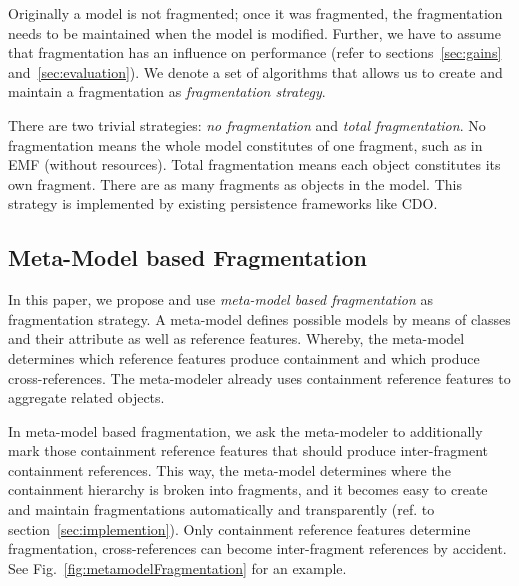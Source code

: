 Originally a model is not fragmented; once it was fragmented, the fragmentation needs to be maintained when the model is modified. Further, we have to assume that fragmentation has an influence on performance (refer to sections~\ref{sec:gains} and~\ref{sec:evaluation}). We denote a set of algorithms that allows us to create and maintain a fragmentation as \emph{fragmentation strategy}.

There are two trivial strategies: \emph{no fragmentation} and \emph{total fragmentation}. No fragmentation means the whole model constitutes of one fragment, such as in EMF (without resources). Total fragmentation means each object constitutes its own fragment. There are as many fragments as objects in the model. This strategy is implemented by existing persistence frameworks like CDO.

\subsection{Meta-Model based Fragmentation}

In this paper, we propose and use \emph{meta-model based fragmentation} as fragmentation strategy. A meta-model defines possible models by means of classes and their attribute as well as reference features. Whereby, the meta-model determines which reference features produce containment and which produce cross-references. The meta-modeler already uses containment reference features to aggregate related objects.

In meta-model based fragmentation, we ask the meta-modeler to additionally mark those containment reference features that should produce inter-fragment containment references. 
This way, the meta-model determines where the containment hierarchy is broken into fragments, and it becomes easy to create and maintain fragmentations automatically and transparently (ref. to section~\ref{sec:implemention}). Only containment reference features determine fragmentation, cross-references can become inter-fragment references by accident. See Fig.~\ref{fig:metamodelFragmentation} for an example.



